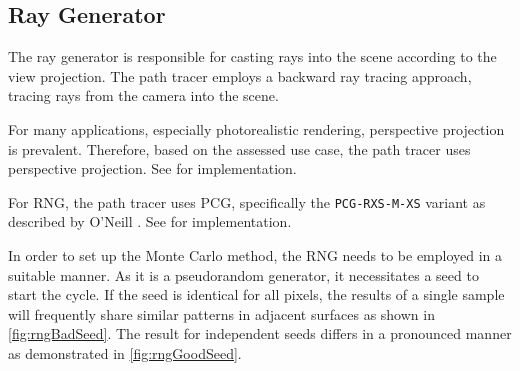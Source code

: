 \subsection*{Ray Generator}

The ray generator is responsible for casting rays into the scene according to the view projection. The path tracer employs a backward ray tracing approach, tracing rays from the camera into the scene.

For many applications, especially photorealistic rendering, perspective projection is prevalent. Therefore, based on the assessed use case, the path tracer uses perspective projection. See  for implementation.

For \gls{RNG}, the path tracer uses \gls{PCG}, specifically the \texttt{PCG-RXS-M-XS} variant as described by O’Neill \cite{o2014pcg}. See  for implementation.

In order to set up the Monte Carlo method, the \gls{RNG} needs to be employed in a suitable manner. As it is a pseudorandom generator, it necessitates a seed to start the cycle. If the seed is identical for all pixels, the results of a single sample will frequently share similar patterns in adjacent surfaces as shown in \autoref{fig:rngBadSeed}. The result for independent seeds differs in a pronounced manner as demonstrated in \autoref{fig:rngGoodSeed}.

